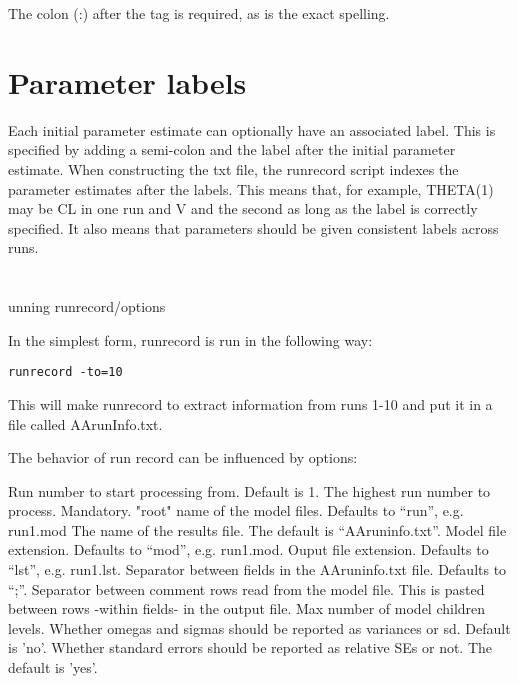 The colon (:) after the tag is required, as is the exact spelling.

\section{Parameter labels}
Each initial parameter estimate can optionally have an associated label. This is specified by adding a semi-colon and the label after the initial parameter estimate. When constructing  the txt file, the runrecord script indexes the parameter estimates after the labels. This means that, for example, THETA(1) may be CL in one run and V and the second as long as the label is correctly specified. It also means that parameters should be given consistent labels across runs.

\section{}unning runrecord/options

In the simplest form, runrecord is run in the following way:

\begin{verbatim}
runrecord -to=10
\end{verbatim}

This will make runrecord to extract information from runs 1-10 and put it in a file called AArunInfo.txt. 

The behavior of run record can be influenced by options:

\begin{optionlist}
Run number to start processing from. Default is 1. 
\nextopt
{}
The highest run number to process. Mandatory. 
\nextopt
{}
"root" name of the model files. Defaults to “run”, e.g. run1.mod 
\nextopt
{}
The name of the results file. The default is “AAruninfo.txt”. 
\nextopt
{}
Model file extension. Defaults to “mod”, e.g. run1.mod. 
\nextopt
{}
Ouput file extension. Defaults to “lst”, e.g. run1.lst. 
\nextopt
{}
Separator between fields in the AAruninfo.txt file. Defaults to “;”. 
\nextopt
{}
Separator between comment rows read from the model file. This is pasted between rows -within fields- in the output file. 
\nextopt
{}
Max number of model children levels. 
\nextopt
{}
Whether omegas and sigmas should be reported as variances or sd. Default is 'no'. 
\nextopt
{}
Whether standard errors should be reported as relative SEs or not. The default is 'yes'. 
\nextopt
\end{optionlist}

